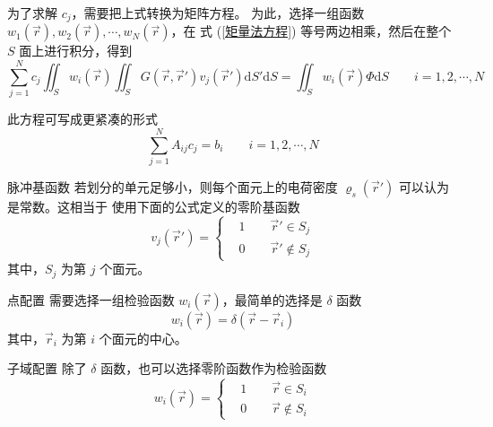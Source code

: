 \par 为了求解 $c_j$，需要把上式转换为矩阵方程。
为此，选择一组函数 $w_1(\vec{r}),w_2(\vec{r}),\cdots,w_N(\vec{r})$，在
式 (\ref{矩量法方程}) 等号两边相乘，然后在整个 $S$ 面上进行积分，得到
\begin{equation}
    \sum_{j=1}^{N} c_j 
    \iint_{S} w_i(\vec{r})
    \iint_{S} G(\vec{r}, \vec{r}') v_j(\vec{r}') \text{d}S' \text{d}S
    =
    \iint_{S} w_i(\vec{r})
    \Phi \text{d}S
    \qquad
    i=1,2,\cdots,N
    \label{矩量法矩阵方程}
\end{equation}
\par 此方程可写成更紧凑的形式
\begin{equation}
    \sum_{j=1}^{N}
    A_{ij} c_j = b_i
    \qquad
    i=1,2,\cdots,N
\end{equation}

\begin{definition}{脉冲基函数}
    若划分的单元足够小，则每个面元上的电荷密度 $\varrho_s(\vec{r}')$ 可以认为是常数。这相当于
    使用下面的公式定义的零阶基函数
    \begin{equation}
        v_j(\vec{r}')=
        \left\{
            \begin{aligned}
                &1 \qquad \vec{r}' \in S_j \\
                &0 \qquad \vec{r}' \notin S_j
            \end{aligned}
        \right.
    \end{equation}
    其中，$S_j$ 为第 $j$ 个面元。
\end{definition}

\begin{definition}{点配置}
    需要选择一组检验函数 $w_i(\vec{r})$，最简单的选择是 $\delta$ 函数
    \begin{equation}
        w_i(\vec{r})=\delta(\vec{r}-\vec{r}_i)
    \end{equation}
    其中，$\vec{r}_i$ 为第 $i$ 个面元的中心。
\end{definition}

\begin{definition}{子域配置}
    除了 $\delta$ 函数，也可以选择零阶函数作为检验函数
    \begin{equation}
        w_i(\vec{r})=
        \left\{
            \begin{aligned}
                &1 \qquad \vec{r} \in S_i \\
                &0 \qquad \vec{r} \notin S_i
            \end{aligned}
        \right.
    \end{equation}
\end{definition}

